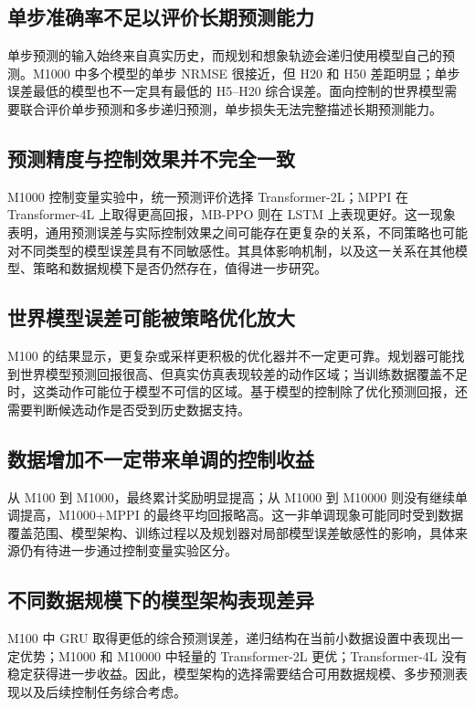 \subsection{单步准确率不足以评价长期预测能力}

单步预测的输入始终来自真实历史，而规划和想象轨迹会递归使用模型自己的预测。M1000 中多个模型的单步 NRMSE 很接近，但 H20 和 H50 差距明显；单步误差最低的模型也不一定具有最低的 H5--H20 综合误差。面向控制的世界模型需要联合评价单步预测和多步递归预测，单步损失无法完整描述长期预测能力。

\subsection{预测精度与控制效果并不完全一致}

M1000 控制变量实验中，统一预测评价选择 Transformer-2L；MPPI 在 Transformer-4L 上取得更高回报，MB-PPO 则在 LSTM 上表现更好。这一现象表明，通用预测误差与实际控制效果之间可能存在更复杂的关系，不同策略也可能对不同类型的模型误差具有不同敏感性。其具体影响机制，以及这一关系在其他模型、策略和数据规模下是否仍然存在，值得进一步研究。

\subsection{世界模型误差可能被策略优化放大}

M100 的结果显示，更复杂或采样更积极的优化器并不一定更可靠。规划器可能找到世界模型预测回报很高、但真实仿真表现较差的动作区域；当训练数据覆盖不足时，这类动作可能位于模型不可信的区域。基于模型的控制除了优化预测回报，还需要判断候选动作是否受到历史数据支持。

\subsection{数据增加不一定带来单调的控制收益}

从 M100 到 M1000，最终累计奖励明显提高；从 M1000 到 M10000 则没有继续单调提高，M1000+MPPI 的最终平均回报略高。这一非单调现象可能同时受到数据覆盖范围、模型架构、训练过程以及规划器对局部模型误差敏感性的影响，具体来源仍有待进一步通过控制变量实验区分。

\subsection{不同数据规模下的模型架构表现差异}

M100 中 GRU 取得更低的综合预测误差，递归结构在当前小数据设置中表现出一定优势；M1000 和 M10000 中轻量的 Transformer-2L 更优；Transformer-4L 没有稳定获得进一步收益。因此，模型架构的选择需要结合可用数据规模、多步预测表现以及后续控制任务综合考虑。

